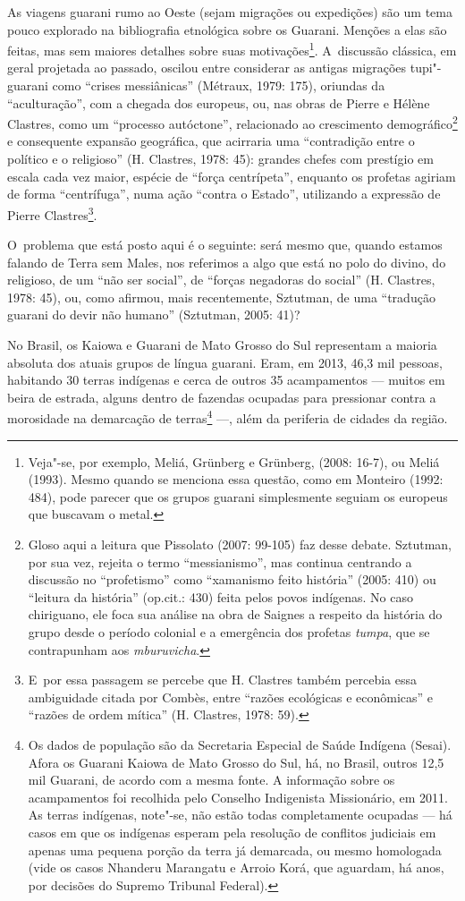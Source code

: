 As viagens guarani rumo ao Oeste (sejam migrações ou expedições) são um
tema pouco explorado na bibliografia etnológica sobre os Guarani.
Menções a elas são feitas, mas sem maiores detalhes sobre suas
motivações\footnote{Veja"-se, por exemplo, Meliá, Grünberg e Grünberg,
(2008: 16-7), ou Meliá (1993). Mesmo quando se menciona essa questão,
como em Monteiro (1992: 484), pode parecer que os grupos guarani
simplesmente seguiam os europeus que buscavam o metal. }. A~discussão
clássica, em geral projetada ao passado, oscilou entre considerar as
antigas migrações tupi"-guarani como ``crises messiânicas'' (Métraux,
1979: 175), oriundas da ``aculturação'', com a chegada dos europeus, ou,
nas obras de Pierre e Hélène Clastres, como um ``processo autóctone'',
relacionado ao crescimento demográfico\footnote{Gloso aqui a leitura
que Pissolato (2007: 99-105) faz desse debate. Sztutman, por sua vez,
rejeita o termo ``messianismo'', mas continua centrando a discussão no
``profetismo'' como ``xamanismo feito história'' (2005: 410) ou ``leitura da
história'' (op.cit.: 430) feita pelos povos indígenas. No caso
chiriguano, ele foca sua análise na obra de Saignes a respeito da
história do grupo desde o período colonial e a emergência dos profetas
\emph{tumpa}, que se contrapunham aos \emph{mburuvicha}.} e consequente expansão
geográfica, que acirraria uma ``contradição entre o político e o
religioso'' (H. Clastres, 1978: 45): grandes chefes com prestígio em
escala cada vez maior, espécie de ``força centrípeta'', enquanto os
profetas agiriam de forma ``centrífuga'', numa ação ``contra o Estado'',
utilizando a expressão de Pierre Clastres\footnote{E~por essa passagem
se percebe que H. Clastres também percebia essa ambiguidade citada por
Combès, entre ``razões ecológicas e econômicas'' e ``razões de ordem
mítica'' (H. Clastres, 1978: 59).}.

O~problema que está posto aqui é o seguinte: será mesmo que, quando
estamos falando de Terra sem Males, nos referimos a algo que está no
polo do divino, do religioso, de um ``não ser social'', de ``forças
negadoras do social'' (H. Clastres, 1978: 45), ou, como afirmou, mais
recentemente, Sztutman, de uma ``tradução guarani do devir não humano''
(Sztutman, 2005: 41)?

No Brasil, os Kaiowa e Guarani de Mato Grosso do Sul representam a
maioria absoluta dos atuais grupos de língua guarani. Eram, em 2013,
46,3 mil pessoas, habitando 30 terras indígenas e cerca de outros 35
acampamentos --- muitos em beira de estrada, alguns dentro de fazendas
ocupadas para pressionar contra a morosidade na demarcação de
terras\footnote{Os dados de população são da Secretaria Especial de
Saúde Indígena (Sesai). Afora os Guarani Kaiowa de Mato Grosso do Sul,
há, no Brasil, outros 12,5 mil Guarani, de acordo com a mesma fonte. A
informação sobre os acampamentos foi recolhida pelo Conselho
Indigenista Missionário, em 2011. As terras indígenas, note"-se, não
estão todas completamente ocupadas --- há casos em que os indígenas
esperam pela resolução de conflitos judiciais em apenas uma pequena
porção da terra já demarcada, ou mesmo homologada (vide os casos
Nhanderu Marangatu e Arroio Korá, que aguardam, há anos, por decisões
do Supremo Tribunal Federal).} ---, além da periferia de cidades da
região.

